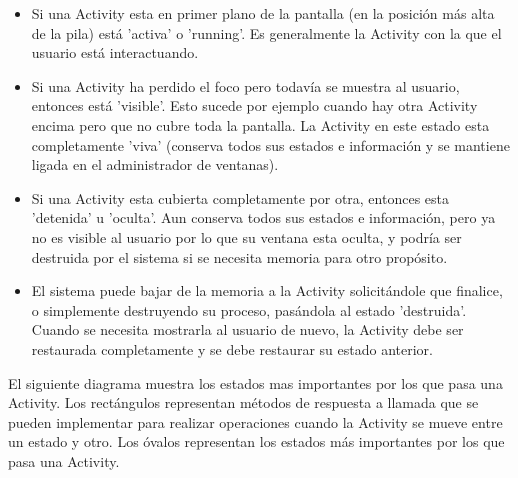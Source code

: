 \begin{itemize}
	\item Si una Activity esta en primer plano de la pantalla (en la posición más alta de la pila) está 'activa' o 'running'. Es generalmente la Activity con la que el usuario está interactuando.
	\item Si una Activity ha perdido el foco pero todavía se muestra al usuario, entonces está 'visible'. Esto sucede por ejemplo cuando hay otra Activity encima pero que no cubre toda la pantalla. La Activity en este estado esta completamente 'viva' (conserva todos sus estados e información y se mantiene ligada en el administrador de ventanas).
	\item Si una Activity esta cubierta completamente por otra, entonces esta 'detenida' u 'oculta'. Aun conserva todos sus estados e información, pero ya no es visible al usuario por lo que su ventana esta oculta, y podría ser destruida por el sistema si se necesita memoria para otro propósito.
	\item El sistema puede bajar de la memoria a la Activity solicitándole que finalice, o simplemente destruyendo su proceso, pasándola al estado 'destruida'. Cuando se necesita mostrarla al usuario de nuevo, la Activity debe ser restaurada completamente y se debe restaurar su estado anterior.
\end{itemize}

El siguiente diagrama muestra los estados mas importantes por los que pasa una Activity. Los rectángulos representan métodos de respuesta a llamada que se pueden implementar para realizar operaciones cuando la Activity se mueve entre un estado y otro. Los óvalos representan los estados más importantes por los que pasa una Activity.
\cite{androidDocs}

